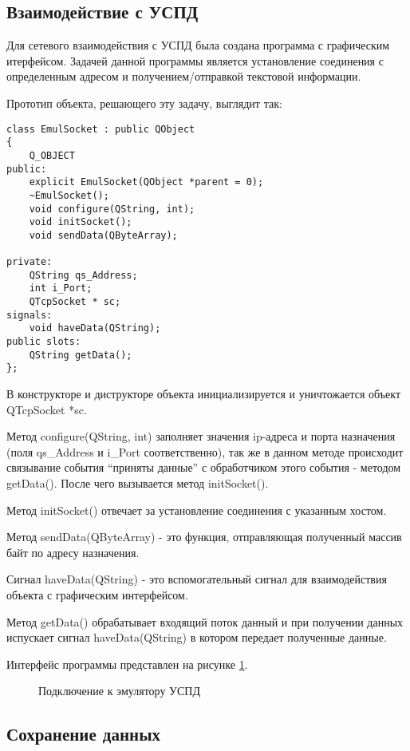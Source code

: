 \subsection{Взаимодействие с УСПД}

Для сетевого взаимодействия с УСПД была создана программа с графическим итерфейсом. Задачей данной программы является установление соединения с определенным адресом и получением/отправкой текстовой информации.

Прототип объекта, решающего эту задачу, выглядит так:

\begin{lstlisting}
class EmulSocket : public QObject
{
    Q_OBJECT
public:
    explicit EmulSocket(QObject *parent = 0);
    ~EmulSocket();
    void configure(QString, int);
    void initSocket();
    void sendData(QByteArray);

private:
    QString qs_Address;
    int i_Port;
    QTcpSocket * sc;
signals:
    void haveData(QString);
public slots:
    QString getData();
};
\end{lstlisting}

В конструкторе и диструкторе объекта инициализируется и уничтожается объект QTcpSocket *sc.

Метод configure(QString, int) заполняет значения ip-адреса и порта назначения (поля qs\_Address и i\_Port соответственно), так же в данном методе происходит связывание события ``приняты данные'' с обработчиком этого события - методом getData(). После чего вызывается метод initSocket().

Метод initSocket() отвечает за установление соединения с указанным хостом.

Метод sendData(QByteArray) - это функция, отправляющая полученный массив байт по адресу назначения.

Сигнал haveData(QString) - это вспомогательный сигнал для взаимодействия объекта с графическим интерфейсом.

Метод getData() обрабатывает входящий поток данный и при получении данных испускает сигнал haveData(QString) в котором передает полученные данные.

Интерфейс программы представлен на рисунке \ref{window1:window1}.

\begin{figure}[h!]
 \caption{Подключение к эмулятору УСПД}
 \label{window1:window1}
\end{figure}

\subsection{Сохранение данных}

